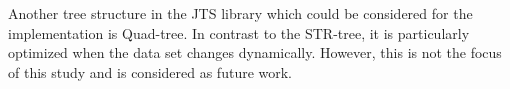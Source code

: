 \documentclass[a4paper,12pt]{article}
\begin{document}
Another tree structure in the JTS library 
which could be considered for the implementation is Quad-tree.  
In contrast to the STR-tree, it is particularly optimized when the data set changes dynamically.
However, this is not the focus of this study and is considered as future work.
\newpage
\end{document}
